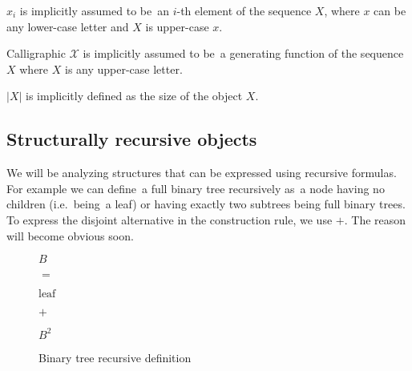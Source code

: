 \documentclass[final]{article}
\theoremstyle{definition}
\theoremstyle{definition}
\theoremstyle{remark}
\newcommand{\gf}[1]{\ensuremath{\mathcal{#1}}}
\newcommand{\size}[1]{\ensuremath{\left|#1\right|}}
\begin{document}
\(x_i\) is implicitly assumed to be~an \(i\)-th element of the sequence \(X\), where \(x\) can be any lower-case letter and \(X\) is upper-case \(x\).

Calligraphic \(\gf{X}\) is implicitly assumed to be~a generating function of the sequence \(X\) where \(X\) is any upper-case letter.

\(\size{X}\) is implicitly defined as the size of the object \(X\).

\subsection{Structurally recursive objects}%
\label{sub:structurally_recursive_objects}

We will be analyzing structures that can be expressed using recursive formulas. For example we can define~a full binary tree recursively as~a node having no children (i.e.~being~a leaf) or having exactly two subtrees being full binary trees. To express the disjoint alternative in the construction rule, we use \(+\). The reason will become obvious soon.

\begin{figure}[H]
    \begin{center}
        \begin{minipage}[t]{.2\textwidth}
            \begin{center}
                \(B\)\\
            \end{center}
        \end{minipage}%
        \begin{minipage}[t]{.05\textwidth}
            \begin{center}
                \(=\)\\
            \end{center}
        \end{minipage}%
        \begin{minipage}[t]{.2\textwidth}
            \begin{center}
                \(\text{leaf}\)\\
            \end{center}
        \end{minipage}%
        \begin{minipage}[t]{.05\textwidth}
            \begin{center}
                \(+\)\\
            \end{center}
        \end{minipage}%
        \begin{minipage}[t]{.2\textwidth}
            \begin{center}
                \(B^2\)\\
            \end{center}
        \end{minipage}%
    \end{center}
    \caption{Binary tree recursive definition}
    \label{fig:binary_recursion}
\end{figure}
\end{document}
